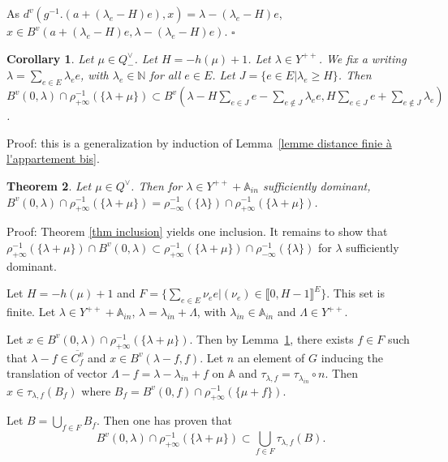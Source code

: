 \documentclass[12pt]{article}
\theoremstyle{plain}
\newtheorem{thm}{Theorem}[section] %
\newtheorem{cor}[thm]{Corollary}
\theoremstyle{definition}
\newcommand{\A}{\mathbb{A}}
\newcommand{\N}{\mathbb{N}}
\begin{document}
As $d^v(g^{-1}.(a+(\lambda_e-H)e),x)=\lambda-(\lambda_e-H)e$, $x\in B^v(a+(\lambda_e -H)e,\lambda-(\lambda_e-H)e)$. $\square$
 
 
 
\begin{cor}\label{lemme majoration du cardinal des boules}
 Let $\mu \in Q^\vee_-$. Let $H=-h(\mu)+1$. Let $\lambda\in Y^{++}$. We fix a writing  $\lambda=\sum_{e\in E}\lambda_e e$, with $\lambda_e\in \N$ for all $e\in E$. Let $J=\{e\in E | \lambda_e \geq H\}$. Then $B^v(0,\lambda)\cap \rho_{+\infty}^{-1}(\{\lambda+\mu\})\subset B^v(\lambda-H\sum_{e\in J} e-\sum_{e\notin J}\lambda_e e, H\sum_{e\in J}e+\sum_{e\notin J}\lambda_ e)$. 
\end{cor}
 
Proof: this is a generalization by induction of Lemma~\ref{lemme distance finie à l'appartement bis}.


    
 \begin{thm}\label{thm égalité des ensembles bis}
 Let $\mu\in Q^\vee$. Then for $\lambda\in Y^{++}+\A_{in}$ sufficiently dominant, $B^v(0,\lambda)\cap \rho_{+\infty}^{-1}(\{\lambda+\mu\})=\rho_{-\infty}^{-1}(\{\lambda\})\cap\rho_{+\infty}^{-1}(\{\lambda+\mu\})$.
 \end{thm}
 
 
Proof: Theorem \ref{thm inclusion} yields one inclusion. It remains to show that $\rho_{+\infty}^{-1}(\{\lambda+\mu\})\cap B^v(0,\lambda)\subset\rho_{+\infty}^{-1}(\{\lambda+\mu\})\cap \rho_{-\infty}^{-1}(\{\lambda\})$ 
for $\lambda$ sufficiently dominant.

\vspace{3mm}
Let $H=-h(\mu)+1$ and $F=\{\sum_{e\in E}\nu_e e|(\nu_e)\in \llbracket 0,H-1\rrbracket^E\}$. This set is finite. Let $\lambda\in Y^{++}+\A_{in}$, $\lambda=\lambda_{in}+\Lambda$, with $\lambda_{in}\in \A_{in}$ and $\Lambda\in Y^{++}$.

Let $x\in B^v(0,\lambda)\cap \rho_{+\infty}^{-1}(\{\lambda+\mu\})$. Then by Lemma~\ref{lemme majoration du cardinal des boules}, there exists $f\in F$ such that $\lambda-f\in \overline{C^v_f}$ and $x\in B^v(\lambda-f,f)$. Let $n$ an element of $G$ inducing the translation of vector $\Lambda-f=\lambda-\lambda_{in}+f$ on $\A$ and $\tau_{\lambda,f}=\tau_{\lambda_{in}}\circ n$. Then $x\in\tau_{\lambda,f}(B_f)$ where $B_f=B^v(0,f)\cap \rho_{+\infty}^{-1}(\{\mu +f\})$.

Let $B=\bigcup_{f\in F}B_f$. Then one has proven that \[B^v(0,\lambda)\cap \rho_{+\infty}^{-1}(\{\lambda+\mu\})\subset \bigcup_{f\in F}\tau_{\lambda,f}(B).\]
\end{document}
